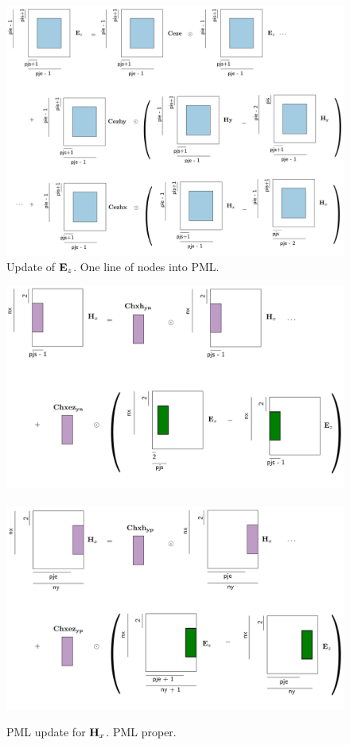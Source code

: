 \documentclass[a4paper,12pt]{article}
\begin{document}
%
\begin{figure}
\centering
\includegraphics[width=1\textwidth]{../pics/tikz/svg/Ez-new-inside.pdf}
\caption{Update of ${\bf E}_z$. One line of nodes into PML.}
\end{figure}
%
%
\begin{figure}
\centering
\includegraphics[width=1\textwidth]{../pics/tikz/svg/pml-color/Hx-pml-yn.pdf}
~
\includegraphics[width=1\textwidth]{../pics/tikz/svg/pml-color/Hx-pml-yp.pdf}
\caption{PML update for ${\bf H}_x$. PML proper.}
\end{figure}
\end{document}
